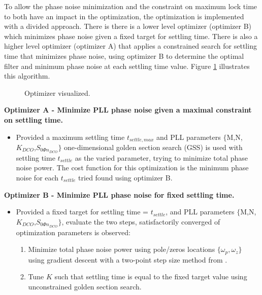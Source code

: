 To allow the phase noise minimization and the constraint on maximum lock time to both have an impact in the optimization, the optimization is implemented with a divided approach. There is there is a lower level optimizer (optimizer B) which minimizes phase noise given a fixed target for settling time. There is also  a higher level optimizer (optimizer A) that applies a constrained search for settling time that minimizes phase noise, using optimizer B to determine the optimal filter and minimum phase noise at each settling time value. Figure \ref{fig:optimizer} illustrates this algorithm.

\begin{figure}[htb!]
	\center
	\caption{Optimizer visualized.}
	\label{fig:optimizer}
\end{figure}

\textbf{Optimizer A - Minimize PLL phase noise given a maximal constraint on settling time.}
\begin{itemize}
	\setlength\itemsep{-0.8em}
	\item Provided a maximum settling time $t_{settle,max}$ and PLL parameters $\{\mathrm{M}$,$\mathrm{N}$,$K_{DCO}$,$S_{0\Phi n_{DCO}}\}$ one-dimensional golden section search (GSS) \cite{press_2007} is used with settling time $t_{settle}$ as the varied parameter, trying to minimize total phase noise power. The cost function for this optimization is the minimum phase noise for each $t_{settle}$ tried found using optimizer B. 
\end{itemize} 
\textbf{Optimizer B - Minimize PLL phase noise for fixed settling time.}\label{lf_opt}
\begin{itemize}
	\setlength\itemsep{-0.8em}
	\item Provided a fixed target for settling time = $t_{settle}$, and PLL parameters $\{\mathrm{M}$,$\mathrm{N}$,$K_{DCO}$,$S_{0\Phi n_{DCO}}\}$, evaluate the two steps, satisfactorily converged of optimization parameters is observed:
	\begin{enumerate}
		\setlength\itemsep{-0.8em}
		\item Minimize total phase noise power using pole/zeros locations $\{\omega_p, \omega_z\}$ using gradient descent with a two-point step size method from \cite{barzilai_borwein_1988}.
		\item Tune $K$ such that settling time is equal to the fixed target value using unconstrained golden section search.
	\end{enumerate}
\end{itemize}

